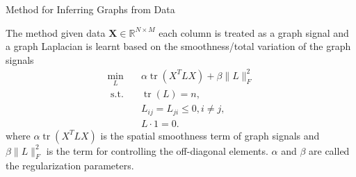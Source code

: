\documentclass[final]{beamer}
\newlength{\colwidth}
\begin{document}
\begin{frame}[t]
\begin{columns}[t]
\begin{column}{\colwidth}
\begin{block}{Method for Inferring Graphs from Data}
    

    
     The method given data $\mathbf{X} \in \mathbb{R}^{N \times M}$ each column is treated as a graph signal and a graph Laplacian is learnt based on the smoothness/total variation of the graph signals
      \begin{equation}
          \begin{aligned}
\min _L \quad & \alpha\operatorname{tr}\left(X^T L X\right)+\beta\|L\|_F^2 \\
\text { s.t. } & \operatorname{tr}(L)=n, \\
& L_{i j}=L_{j i} \leq 0, i \neq j, \\
& L \cdot 1=0 .
\end{aligned}
      \end{equation}
       where $\alpha\operatorname{tr}\left(X^T L X\right)$ is the spatial smoothness term of graph signals and $\beta\|L\|_F^2$ is the term for controlling the off-diagonal elements. $\alpha$ and $\beta$ are called the regularization parameters. 
  

\end{block}
\end{column}
\end{columns}
\end{frame}
\end{document}
